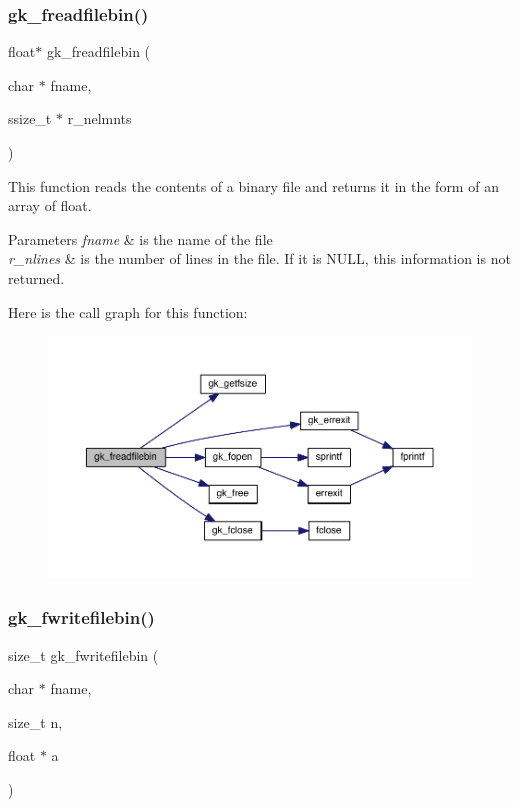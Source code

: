 \subsubsection{\texorpdfstring{gk\+\_\+freadfilebin()}{gk\_freadfilebin()}}
{\footnotesize\ttfamily float$\ast$ gk\+\_\+freadfilebin (\begin{DoxyParamCaption}\item[{char $\ast$}]{fname,  }\item[{ssize\+\_\+t $\ast$}]{r\+\_\+nelmnts }\end{DoxyParamCaption})}

This function reads the contents of a binary file and returns it in the form of an array of float. 
\begin{DoxyParams}{Parameters}
{\em fname} & is the name of the file \\
\hline
{\em r\+\_\+nlines} & is the number of lines in the file. If it is N\+U\+LL, this information is not returned. \\
\hline
\end{DoxyParams}
Here is the call graph for this function\+:\nopagebreak
\begin{figure}[H]
\begin{center}
\leavevmode
\includegraphics[width=350pt]{a00855_a825d4634e2e656bc3dc9f3af0c9b1d5d_cgraph}
\end{center}
\end{figure}
\mbox{\label{a00855_a44ee9129d983bd435f96f9c1404f603d}} 
\subsubsection{\texorpdfstring{gk\+\_\+fwritefilebin()}{gk\_fwritefilebin()}}
{\footnotesize\ttfamily size\+\_\+t gk\+\_\+fwritefilebin (\begin{DoxyParamCaption}\item[{char $\ast$}]{fname,  }\item[{size\+\_\+t}]{n,  }\item[{float $\ast$}]{a }\end{DoxyParamCaption})}

